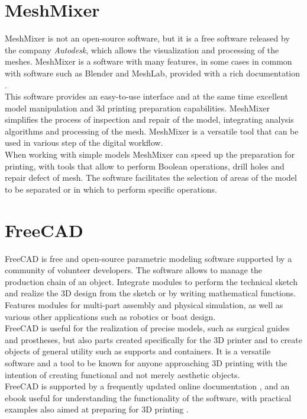 \section{MeshMixer}
MeshMixer \parencite{Reference38} is not an open-source software, but it is a free software released by the company \emph{Autodesk}, which allows the visualization and processing of the meshes. MeshMixer is a software with many features, in some cases in common with software such as Blender and MeshLab, provided with a rich documentation \parencite{Reference39}. \\
This software provides an easy-to-use interface and at the same time excellent model manipulation and 3d printing preparation capabilities. MeshMixer simplifies the process of inspection and repair of the model, integrating analysis algorithms and processing of the mesh. MeshMixer is a versatile tool that can be used in various step of the digital workflow. \\
When working with simple models MeshMixer can speed up the preparation for printing, with tools that allow to perform Boolean operations, drill holes and repair defect of mesh. The software facilitates the selection of areas of the model to be separated or in which to perform specific operations.

\section{FreeCAD}
FreeCAD \parencite{Reference40} is free and open-source parametric modeling software supported by a community of volunteer developers. The software allows to manage the production chain of an object. Integrate modules to perform the technical sketch and realize the 3D design from the sketch or by writing mathematical functions. Features modules for multi-part assembly and physical simulation, as well as various other applications such as robotics or boat design. \\
FreeCAD is useful for the realization of precise models, such as surgical guides and prostheses, but also parts created specifically for the 3D printer and to create objects of general utility such as supports and containers. It is a versatile software and a tool to be known for anyone approaching 3D printing with the intention of creating functional and not merely aesthetic objects.\\
FreeCAD is supported by a frequently updated online documentation \parencite{Reference41}, and an ebook useful for understanding the functionality of the software, with practical examples also aimed at preparing for 3D printing \parencite{Reference42}.

